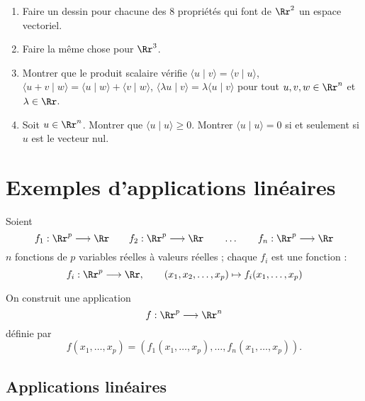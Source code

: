 \documentclass[class=report,crop=false]{standalone}
\begin{document}

\begin{miniexercices}
\sauteligne
\begin{enumerate}
  \item Faire un dessin pour chacune des $8$ propriétés qui font de $\Rr^2$ un espace vectoriel.

  \item Faire la même chose pour $\Rr^3$.

  \item Montrer que le produit scalaire vérifie
  $\langle u \mid v \rangle = \langle v \mid u \rangle$,
  $\langle u+v \mid w \rangle = \langle u \mid w \rangle + \langle v \mid w \rangle$,
  $\langle \lambda u \mid v \rangle = \lambda\langle  u \mid v \rangle$ pour tout $u,v,w \in \Rr^n$ et $\lambda\in \Rr$.

  \item Soit $u\in \Rr^n$. Montrer que $\langle u \mid u \rangle \ge 0$.
  Montrer $\langle u \mid u \rangle = 0$ si et seulement si $u$ est le vecteur nul.
\end{enumerate}
\end{miniexercices}


\section{Exemples d'applications linéaires}


Soient
$$f_1 : \Rr^p \longrightarrow \Rr \qquad f_2 : \Rr^p \longrightarrow \Rr \qquad \ldots \qquad f_n : \Rr^p \longrightarrow \Rr$$
$n$ fonctions de $p$ variables réelles à valeurs réelles ;
chaque $f_i$ est une fonction :
$$f_i : \Rr^p \longrightarrow \Rr, \qquad (x_1,x_2,\ldots,x_p) \mapsto f_i(x_1,\ldots,x_p)$$

On construit une application
$$f : \Rr^p \longrightarrow \Rr^n$$
définie par
$$f(x_1,\dots , x_p)  = \left(f_1 (x_1, \dots , x_p), \dots , f_n (x_1, \dots , x_p)\right).$$


\subsection{Applications linéaires}
\end{document}
